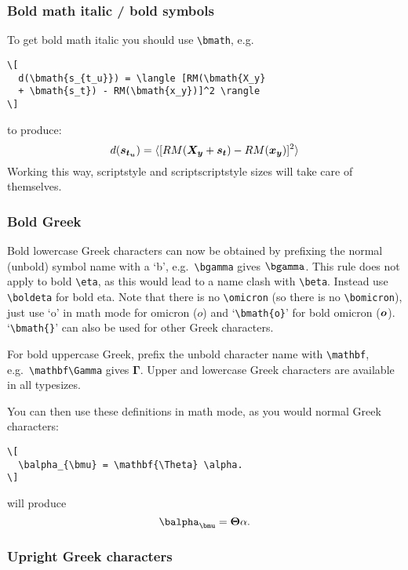 \documentclass[useAMS,usenatbib]{mn2e}
\begin{document}
\subsubsection{Bold math italic / bold symbols}

To get bold math italic you should use \verb"\bmath", e.g.
%
\begin{verbatim}
\[
  d(\bmath{s_{t_u}}) = \langle [RM(\bmath{X_y}
  + \bmath{s_t}) - RM(\bmath{x_y})]^2 \rangle
\]
\end{verbatim}
%
to produce:
\[
  d(\bmath{s_{t_u}}) = \langle [RM(\bmath{X_y}
  + \bmath{s_t}) - RM(\bmath{x_y})]^2 \rangle
\]
Working this way, scriptstyle and scriptscriptstyle sizes will take care of
themselves.

\subsubsection{Bold Greek}\label{boldgreek}

Bold lowercase Greek characters can now be obtained by prefixing the normal
(unbold) symbol name with a `b', e.g.\ \verb"\bgamma" gives $\bgamma$. This
rule does not apply to bold \verb"\eta", as this would lead to a name clash
with \verb"\beta". Instead use \verb"\boldeta" for bold eta. Note that
there is no \verb"\omicron" (so there is no \verb"\bomicron"), just use `o'
in math mode for omicron ($o$) and `\verb"\bmath{o}"' for bold omicron
($\bmath{o}$). `\verb"\bmath{}"' can also be used for other Greek
characters.

For bold uppercase Greek, prefix the unbold character name with
%
\verb"\mathbf", e.g.\ \verb"\mathbf\Gamma" gives $\mathbf\Gamma$.
%
Upper and lowercase Greek characters are available in all typesizes.

You can then use these definitions in math mode, as you would normal Greek
characters:
%
\begin{verbatim}
\[
  \balpha_{\bmu} = \mathbf{\Theta} \alpha.
\]
\end{verbatim}
%
%
will produce
%
\[
  \balpha_{\bmu} = \mathbf{\Theta} \alpha.
\]
%

\subsubsection{Upright Greek characters}\label{upgreek}
\end{document}
